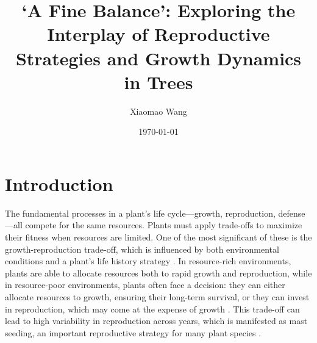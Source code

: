 \documentclass[11pt,letter]{article}
\begin{document}
\title{`A Fine Balance': Exploring the Interplay of Reproductive Strategies and Growth Dynamics in Trees}
\author{Xiaomao Wang} 
\date{\today}
\maketitle

\setlength{\parindent}{0pt}
\setlength{\parskip}{3pt}


\section{Introduction} 
The fundamental processes in a plant's life cycle—growth, reproduction, defense—all compete for the same resources. Plants must apply trade-offs to maximize their fitness when resources are limited. One of the most significant of these is the growth-reproduction trade-off, which is influenced by both environmental conditions and a plant's life history strategy \citep{grime1977evidence, stearns1998evolution}. In resource-rich environments, plants are able to allocate resources both to rapid growth and reproduction, while in resource-poor environments, plants often face a decision: they can either allocate resources to growth, ensuring their long-term survival, or they can invest in reproduction, which may come at the expense of growth \citep{bazzaz1997allocation}. This trade-off can lead to high variability in reproduction across years, which is manifested as mast seeding, an important reproductive strategy for many plant species \citep{pearse2016mechanisms}.\par
\end{document}
